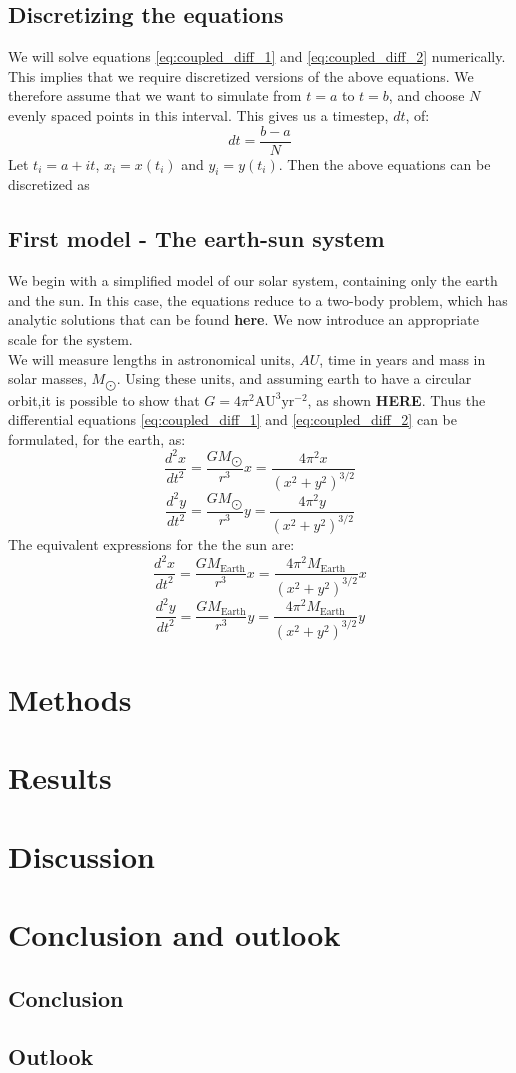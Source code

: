 \documentclass[a4paper, 10pt]{article}
\begin{document}
\subsection{Discretizing the equations}
We will solve equations \ref{eq:coupled_diff_1} and \eqref{eq:coupled_diff_2} numerically. This implies that we require discretized versions of the above equations. We therefore assume that we want to simulate from $t=a$ to $t=b$, and choose $N$ evenly spaced points in this interval. This gives us a timestep, $dt$, of:
$$dt=\frac{b-a}{N}$$
Let $t_i=a+it$, $x_i=x(t_i)$ and $y_i=y(t_i)$. Then the above equations can be discretized as


\subsection{First model - The earth-sun system}
We begin with a simplified model of our solar system, containing only the earth and the sun. In this case, the equations reduce to a two-body problem, which has analytic solutions that can be found \textbf{here}. We now introduce an appropriate scale for the system.\\
\linebreak
We will measure lengths in astronomical units, $AU$, time in years and mass in solar masses, $M_{\bigodot}$. Using these units, and assuming earth to have a circular orbit,it is possible to show that $G=4\pi^2 \mathrm{AU^3 yr^{-2}}$, as shown \textbf{HERE}. Thus the differential equations \ref{eq:coupled_diff_1} and \ref{eq:coupled_diff_2} can be formulated, for the earth, as:
$$\frac{d^2x}{dt^2}=\frac{GM_{\bigodot}}{r^3}x=\frac{4\pi^2 x}{(x^2+y^2)^{3/2}}$$
$$\frac{d^2y}{dt^2}=\frac{GM_{\bigodot}}{r^3}y=\frac{4\pi^2 y}{(x^2+y^2)^{3/2}}$$
The equivalent expressions for the the sun are:
$$\frac{d^2x}{dt^2}=\frac{GM_{\mathrm{Earth}}}{r^3}x=\frac{4\pi^2 M_{\mathrm{Earth}} }{(x^2+y^2)^{3/2}}x$$
$$\frac{d^2y}{dt^2}=\frac{GM_{\mathrm{Earth}}}{r^3}y=\frac{4\pi^2 M_{\mathrm{Earth}} }{(x^2+y^2)^{3/2}}y$$

\section{Methods}
\section{Results}
\section{Discussion}
\section{Conclusion and outlook}
\subsection{Conclusion}
\subsection{Outlook}
\end{document}
